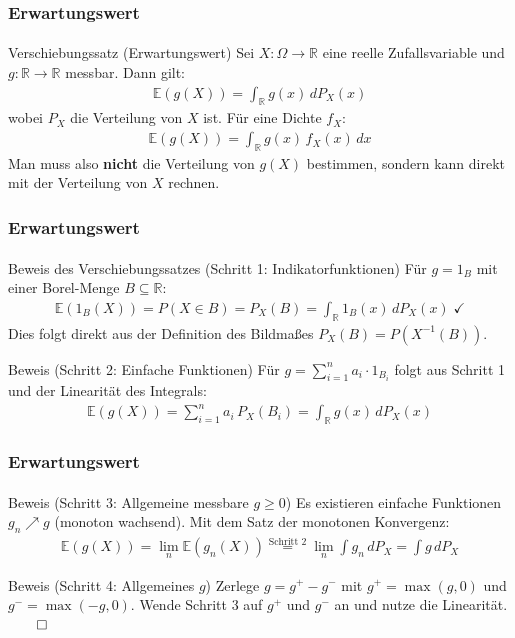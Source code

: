 \documentclass{beamer}
\begin{document}
 \begin{frame}
    \frametitle{Erwartungswert}
\framesubtitle{}
\begin{block}{Verschiebungssatz (Erwartungswert)}
Sei $X : \Omega \to \mathbb{R}$ eine reelle Zufallsvariable und $g : \mathbb{R} \to \mathbb{R}$ messbar. Dann gilt:
\begin{align*}
\mathbb{E}(g(X)) = \int_{\mathbb{R}} g(x) \, dP_X(x)
\end{align*}
wobei $P_X$ die Verteilung von $X$ ist. Für eine Dichte $f_X$:
\begin{align*}
\mathbb{E}(g(X)) = \int_{\mathbb{R}} g(x) \, f_X(x) \, dx
\end{align*}
Man muss also \textbf{nicht} die Verteilung von $g(X)$ bestimmen, sondern kann direkt mit der Verteilung von $X$ rechnen.
\end{block}
 \end{frame}

 \begin{frame}
    \frametitle{Erwartungswert}
\framesubtitle{}
\begin{block}{Beweis des Verschiebungssatzes (Schritt 1: Indikatorfunktionen)}
Für $g = 1_B$ mit einer Borel-Menge $B \subseteq \mathbb{R}$:
\begin{align*}
\mathbb{E}(1_B(X)) = P(X \in B) = P_X(B) = \int_{\mathbb{R}} 1_B(x) \, dP_X(x) \; \checkmark
\end{align*}
Dies folgt direkt aus der Definition des Bildmaßes $P_X(B) = P(X^{-1}(B))$.
\end{block}

\begin{block}{Beweis (Schritt 2: Einfache Funktionen)}
Für $g = \sum_{i=1}^n a_i \cdot 1_{B_i}$ folgt aus Schritt 1 und der Linearität des Integrals:
\begin{align*}
\mathbb{E}(g(X)) = \sum_{i=1}^n a_i \, P_X(B_i) = \int_{\mathbb{R}} g(x) \, dP_X(x)
\end{align*}
\end{block}
 \end{frame}

 \begin{frame}
    \frametitle{Erwartungswert}
\framesubtitle{}
\begin{block}{Beweis (Schritt 3: Allgemeine messbare $g \geq 0$)}
Es existieren einfache Funktionen $g_n \nearrow g$ (monoton wachsend). Mit dem Satz der monotonen Konvergenz:
\begin{align*}
\mathbb{E}(g(X)) = \lim_n \mathbb{E}(g_n(X)) \overset{\text{Schritt 2}}{=} \lim_n \int g_n \, dP_X = \int g \, dP_X
\end{align*}
\end{block}

\begin{block}{Beweis (Schritt 4: Allgemeines $g$)}
Zerlege $g = g^+ - g^-$ mit $g^+ = \max(g,0)$ und $g^- = \max(-g,0)$.
Wende Schritt 3 auf $g^+$ und $g^-$ an und nutze die Linearität. $\qed$
\end{block}
 \end{frame}
\end{document}
